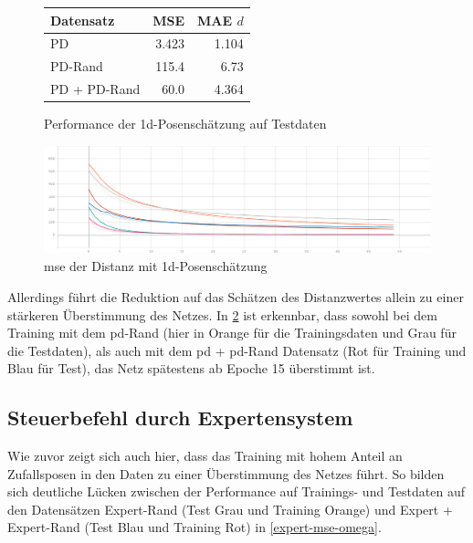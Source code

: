 \begin{figure}[H]
	\centering
	\begin{tabular}[t]{|l|r|r|}
		\hline
		Datensatz & MSE & MAE $d$ \\
		\hline
		PD & 3.423 & 1.104 \\
		\hline
		PD-Rand & 115.4 & 6.73 \\
		\hline
		PD + PD-Rand & 60.0 & 4.364 \\
		\hline
	\end{tabular}
	\caption{Performance der \acs{1d}-Posenschätzung auf Testdaten}
	\label{1d-pose-performance}
\end{figure}

\begin{figure}[H]
	\centering
	\includegraphics[width=\linewidth]{kapitel5/images/tensorboard/d-only/Loss-d-only.png}
	\caption{\acs{mse} der Distanz mit \acs{1d}-Posenschätzung}
	\label{1d-poses-mse-d}
\end{figure}

Allerdings führt die Reduktion auf das Schätzen des Distanzwertes allein zu einer stärkeren Überstimmung des Netzes. In \ref{1d-poses-mse-d} ist erkennbar, dass sowohl bei dem Training mit dem \glqq\acs{pd}-Rand\grqq{} (hier in Orange für die Trainingsdaten und Grau für die Testdaten), als auch mit dem \glqq\acs{pd} + \acs{pd}-Rand\grqq{} Datensatz (Rot für Training und Blau für Test), das Netz spätestens ab Epoche 15 überstimmt ist.

\subsection{Steuerbefehl durch Expertensystem}


Wie zuvor zeigt sich auch hier, dass das Training mit hohem Anteil an Zufallsposen in den Daten zu einer Überstimmung des Netzes führt. So bilden sich deutliche Lücken zwischen der Performance auf Trainings- und Testdaten auf den Datensätzen \glqq Expert-Rand\grqq{} (Test Grau und Training Orange) und \glqq Expert + Expert-Rand\grqq{} (Test Blau und Training Rot) in \ref{expert-mse-omega}.



